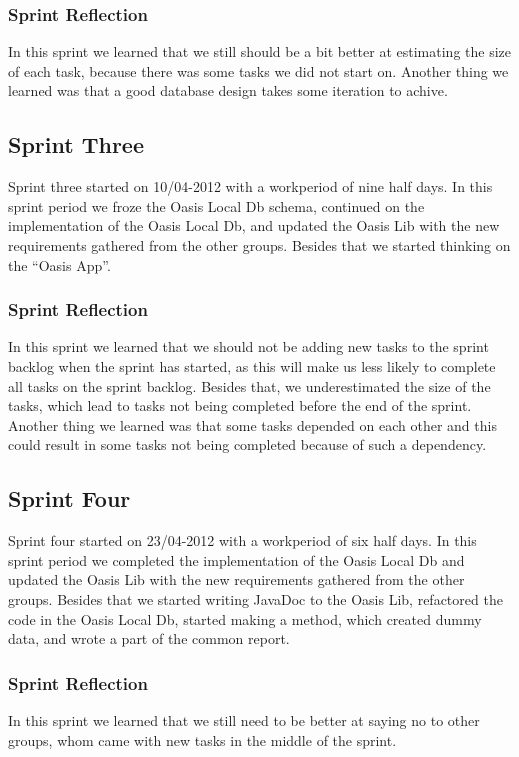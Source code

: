 \subsubsection{Sprint Reflection}
In this sprint we learned that we still should be a bit better at estimating the size of each task, because there was some tasks we did not start on.
Another thing we learned was that a good database design takes some iteration to achive.

\subsection{Sprint Three}
Sprint three started on 10/04-2012 with a workperiod of nine half days. In this sprint period we froze the Oasis Local Db schema, continued on the implementation of the Oasis Local Db, and updated the Oasis Lib with the new requirements gathered from the other groups. 
Besides that we started thinking on the ``Oasis App''.

\subsubsection{Sprint Reflection}
In this sprint we learned that we should not be adding new tasks to the sprint backlog when the sprint has started, as this will make us less likely to complete all tasks on the sprint backlog.
Besides that, we underestimated the size of the tasks, which lead to tasks not being completed before the end of the sprint.
Another thing we learned was that some tasks depended on each other and this could result in some tasks not being completed because of such a dependency.

\subsection{Sprint Four}
Sprint four started on 23/04-2012 with a workperiod of six half days. In this sprint period we completed the implementation of the Oasis Local Db and updated the Oasis Lib with the new requirements gathered from the other groups. Besides that we started writing JavaDoc to the Oasis Lib, refactored the code in the Oasis Local Db, started making a method, which created dummy data, and wrote a part of the common report.

\subsubsection{Sprint Reflection}
In this sprint we learned that we still need to be better at saying no to other groups, whom came with new tasks in the middle of the sprint.

